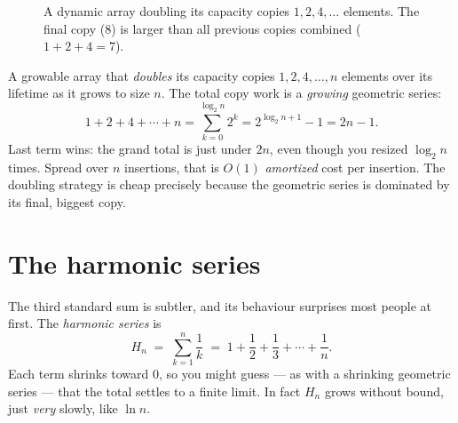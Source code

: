 \begin{example}
\label{ch37:ex-doubling}
\begin{figure}[H]
\centering
{}
\caption{A dynamic array doubling its capacity copies $1, 2, 4, \dots$ elements. The final copy (8) is larger than all previous copies combined ($1+2+4=7$).}
\label{ch37:fig-array-doubling}
\end{figure}

A growable array that \emph{doubles} its capacity copies $1, 2, 4, \dots, n$
elements over its lifetime as it grows to size $n$. The total copy work is a
\emph{growing} geometric series:
\[
  1 + 2 + 4 + \cdots + n = \sum_{k=0}^{\log_2 n} 2^k = 2^{\log_2 n + 1} - 1 = 2n - 1.
\]
Last term wins: the grand total is just under $2n$, even though you resized
$\log_2 n$ times. Spread over $n$ insertions, that is $O(1)$ \emph{amortized}
cost per insertion. The doubling strategy is cheap precisely because the
geometric series is dominated by its final, biggest copy.
\end{example}

\section{The harmonic series}
\label{ch37:harmonic}

The third standard sum is subtler, and its behaviour surprises most people at
first. The \emph{harmonic series} is
\[
  H_n \;=\; \sum_{k=1}^{n} \frac{1}{k} \;=\; 1 + \frac12 + \frac13 + \cdots + \frac1n .
\]
Each term shrinks toward $0$, so you might guess --- as with a shrinking geometric
series --- that the total settles to a finite limit. In fact $H_n$ grows
without bound, just \emph{very} slowly, like $\ln n$.

